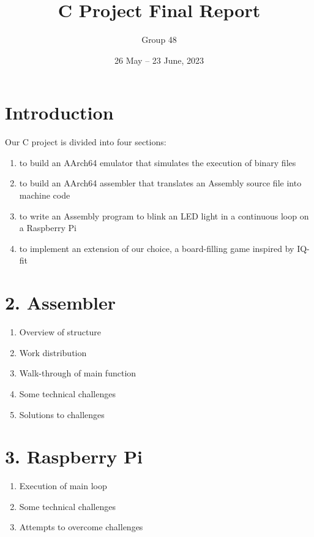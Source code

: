 \documentclass{article}
\title{C Project Final Report}
\author{Group 48}
\date{26 May – 23 June, 2023}
\begin{document}
 

\maketitle 

\section{Introduction} 

Our C project is divided into four sections: 

\begin{enumerate} 

\item to build an AArch64 emulator that simulates the execution of binary files  

\item to build an AArch64 assembler that translates an Assembly source file into machine code 

\item to write an Assembly program to blink an LED light in a continuous loop on a Raspberry Pi 

\item to implement an extension of our choice, a board-filling game inspired by IQ-fit 

\end{enumerate} 

\section*{2. Assembler}   
\begin{enumerate}
    \item Overview of structure
    \item Work distribution
    \item Walk-through of main function
    \item Some technical challenges
    \item Solutions to challenges
\end{enumerate}

\section*{3. Raspberry Pi} 
\begin{enumerate}
    \item Execution of main loop
    \item Some technical challenges
    \item Attempts to overcome challenges
\end{enumerate}
\end{document}

